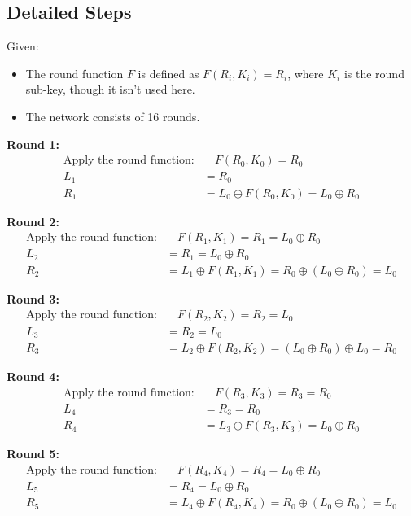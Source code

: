 \documentclass[12pt]{article}
\begin{document}
\subsection*{Detailed Steps}

Given:
\begin{itemize}
    \item The round function \( F \) is defined as \( F(R_i, K_i) = R_i \), where \( K_i \) is the round sub-key, though it isn't used here.
    \item The network consists of 16 rounds.
\end{itemize}

\textbf{Round 1:}
\begin{align*}
    \text{Apply the round function:} & \quad F(R_0, K_0) = R_0 \\
    L_1 &= R_0 \\
    R_1 &= L_0 \oplus F(R_0, K_0) = L_0 \oplus R_0
\end{align*}

\textbf{Round 2:}
\begin{align*}
    \text{Apply the round function:} & \quad F(R_1, K_1) = R_1 = L_0 \oplus R_0 \\
    L_2 &= R_1 = L_0 \oplus R_0 \\
    R_2 &= L_1 \oplus F(R_1, K_1) = R_0 \oplus (L_0 \oplus R_0) = L_0
\end{align*}

\textbf{Round 3:}
\begin{align*}
    \text{Apply the round function:} & \quad F(R_2, K_2) = R_2 = L_0 \\
    L_3 &= R_2 = L_0 \\
    R_3 &= L_2 \oplus F(R_2, K_2) = (L_0 \oplus R_0) \oplus L_0 = R_0
\end{align*}

\textbf{Round 4:}
\begin{align*}
    \text{Apply the round function:} & \quad F(R_3, K_3) = R_3 = R_0 \\
    L_4 &= R_3 = R_0 \\
    R_4 &= L_3 \oplus F(R_3, K_3) = L_0 \oplus R_0
\end{align*}

\textbf{Round 5:}
\begin{align*}
    \text{Apply the round function:} & \quad F(R_4, K_4) = R_4 = L_0 \oplus R_0 \\
    L_5 &= R_4 = L_0 \oplus R_0 \\
    R_5 &= L_4 \oplus F(R_4, K_4) = R_0 \oplus (L_0 \oplus R_0) = L_0
\end{align*}
\end{document}
